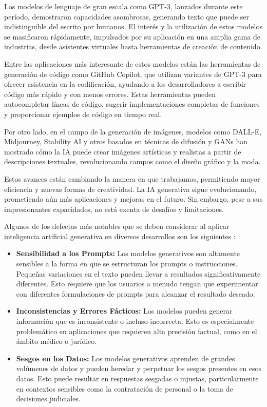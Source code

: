 Los modelos de lenguaje de gran escala como GPT-3, lanzados durante este período, demostraron capacidades asombrosas, generando texto que puede ser indistinguible del escrito por humanos. El interés y la utilización de estos modelos se masificaron rápidamente, impulsados por su aplicación en una amplia gama de industrias, desde asistentes virtuales hasta herramientas de creación de contenido.\citep{V7Labs2023}

Entre las aplicaciones más interesante de estos modelos están las herramientas de generación de código como GitHub Copilot, que utilizan variantes de GPT-3 para ofrecer asistencia en la codificación, ayudando a los desarrolladores a escribir código más rápido y con menos errores. Estas herramientas pueden autocompletar líneas de código, sugerir implementaciones completas de funciones y proporcionar ejemplos de código en tiempo real. \citep{GitHubCopilot2023}

Por otro lado, en el campo de la generación de imágenes, modelos como DALL-E, Midjourney, Stability AI y otros basados en técnicas de difusión y GANs han mostrado cómo la IA puede crear imágenes artísticas y realistas a partir de descripciones textuales, revolucionando campos como el diseño gráfico y la moda. \citep{BattleOfCreativity2024}



Estos avances están cambiando la manera en que trabajamos, permitiendo mayor eficiencia y nuevas formas de creatividad. La IA generativa sigue evolucionando, prometiendo aún más aplicaciones y mejoras en el futuro. Sin embargo, pese a sus impresionantes capacidades, no está exenta de desafíos y limitaciones. 

Algunos de los defectos más notables que se deben considerar al aplicar inteligencia artificial generativa en diversos desarrollos son los siguientes \citep{TowardsAI2024}:

\begin{itemize}
    \item \textbf{Sensibilidad a los Prompts:} Los modelos generativos son altamente sensibles a la forma en que se estructuran los prompts o instrucciones. Pequeñas variaciones en el texto pueden llevar a resultados significativamente diferentes. Esto requiere que los usuarios a menudo tengan que experimentar con diferentes formulaciones de prompts para alcanzar el resultado deseado.
    \item \textbf{Inconsistencias y Errores Fácticos:} Los modelos pueden generar información que es inconsistente o incluso incorrecta. Esto es especialmente problemático en aplicaciones que requieren alta precisión factual, como en el ámbito médico o jurídico.
    \item \textbf{Sesgos en los Datos:} Los modelos generativos aprenden de grandes volúmenes de datos y pueden heredar y perpetuar los sesgos presentes en esos datos. Esto puede resultar en respuestas sesgadas o injustas, particularmente en contextos sensibles como la contratación de personal o la toma de decisiones judiciales.
\end{itemize}

